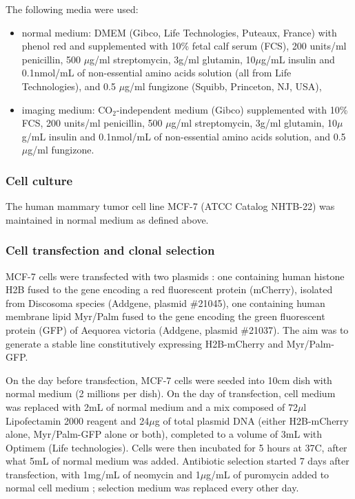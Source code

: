 The following media were used:
\begin{itemize}
\item normal medium: DMEM (Gibco\up{\textregistered}, Life Technologies\texttrademark, Puteaux, France) with phenol red and supplemented with 10\% fetal calf serum (FCS), 200 units/ml penicillin, 500 $\mu$g/ml streptomycin, 3g/ml glutamin, 10$\mu$g/mL insulin and 0.1nmol/mL %
of non-essential amino acids solution (all from Life Technologies\texttrademark), and 0.5 $\mu$g/ml fungizone (Squibb, Princeton, NJ, USA),
\item imaging medium: CO$_2$-independent medium (Gibco\up{\textregistered}) supplemented with 10\% FCS, 200 units/ml penicillin, 500 $\mu$g/ml streptomycin, 3g/ml glutamin, 10$\mu$g/mL insulin and 0.1nmol/mL %
of non-essential amino acids solution, and 0.5 $\mu$g/ml fungizone.
\end{itemize}

\subsubsection{Cell culture}
The human mammary tumor cell line MCF-7 (ATCC\up{\textregistered} Catalog NHTB-22\texttrademark)  was maintained in normal medium as defined above. %
\subsubsection{Cell transfection and clonal selection}
MCF-7 cells were transfected with two plasmids : one containing human histone H2B fused to the gene encoding a red fluorescent protein (mCherry), isolated from Discosoma species (Addgene, plasmid \#21045), one containing human membrane lipid Myr/Palm fused to the gene encoding the green fluorescent protein (GFP) of Aequorea victoria (Addgene, plasmid \#21037). The aim was to generate a stable line constitutively expressing H2B-mCherry and Myr/Palm-GFP.

On the day before transfection, MCF-7 cells were seeded into 10cm dish with normal medium (2 millions per dish). On the day of transfection, cell medium was replaced with 2mL of normal medium and a mix composed of 72$\mu$l Lipofectamin\up{\textregistered} 2000 reagent and 24$\mu$g of total plasmid DNA (either H2B-mCherry alone, Myr/Palm-GFP alone or both), completed to a volume of 3mL with Optimem (Life technologies\texttrademark). Cells were then incubated for 5 hours at 37C, after what 5mL of normal medium was added. 
Antibiotic selection started 7 days after transfection, with 1mg/mL of neomycin and 1$\mu$g/mL of puromycin added to normal cell medium ; selection medium was replaced every other day.

